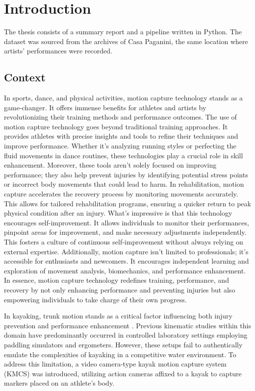 \chapter{Introduction}
The thesis consists of a summary report and a pipeline written in Python.
The dataset was sourced from the archives of Casa Paganini, the same location where artists' performances were recorded. 

\section{Context}
In sports, dance, and physical activities, motion capture technology stands as a game-changer.
It offers immense benefits for athletes and artists by revolutionizing their training methods and performance outcomes.
The use of motion capture technology goes beyond traditional training approaches.
It provides athletes with precise insights and tools to refine their techniques and improve performance.
Whether it's analyzing running styles or perfecting the fluid movements in dance routines, these technologies play a crucial role in skill enhancement.
Moreover, these tools aren't solely focused on improving performance; they also help prevent injuries by identifying potential stress points or incorrect body movements that could lead to harm.
In rehabilitation, motion capture accelerates the recovery process by monitoring movements accurately. This allows for tailored rehabilitation programs, ensuring a quicker return to peak physical condition after an injury.
What's impressive is that this technology encourages self-improvement.
It allows individuals to monitor their performances, pinpoint areas for improvement, and make necessary adjustments independently. This fosters a culture of continuous self-improvement without always relying on external expertise.
Additionally, motion capture isn't limited to professionals; it's accessible for enthusiasts and newcomers. It encourages independent learning and exploration of movement analysis, biomechanics, and performance enhancement.
In essence, motion capture technology redefines training, performance, and recovery by not only enhancing performance and preventing injuries but also empowering individuals to take charge of their own progress.


In kayaking, trunk motion stands as a critical factor influencing both injury prevention and performance enhancement \cite{kayak}.
Previous kinematic studies within this domain have predominantly occurred in controlled laboratory settings employing paddling simulators and ergometers.
However, these setups fail to authentically emulate the complexities of kayaking in a competitive water environment.
To address this limitation, a video camera-type kayak motion capture system (KMCS) was introduced, utilizing action cameras affixed to a kayak to capture markers placed on an athlete's body.

